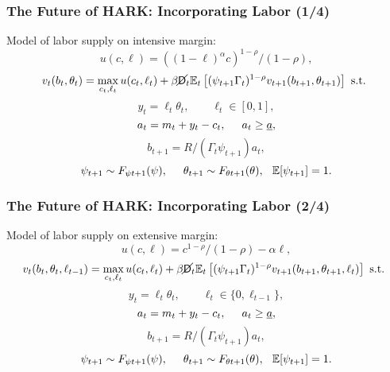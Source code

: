\documentclass[11pt,handout]{beamer}
\newcommand{\E}{\mathbb{E}}
\newcommand{\Die}{\mathsf{D}}
\newcommand{\Live}{\cancel{\Die}}
\begin{document}
\begin{frame}
\frametitle{The Future of HARK: Incorporating Labor (1/4)}
Model of labor supply on intensive margin:
\begin{equation*}
u(c,\ell) = ((1-\ell)^\alpha c)^{1-\rho}/(1-\rho),
\end{equation*}
\begin{equation*}
v_t(b_t,\theta_t) = \max_{c_t, \ell_t} u(c_t,\ell_t) + \beta \Live_t \E_t \left[(\psi_{t+1} \Gamma_t)^{1-\rho} v_{t+1}(b_{t+1},\theta_{t+1}) \right] \text{ s.t. }
\end{equation*}
\begin{equation*}
y_t = \ell_t \theta_t, \qquad \ell_t \in [0,1],
\end{equation*}
\begin{equation*}
a_t = m_t + y_t - c_t, \hspace{0.5cm} a_t \geq \underline{a},
\end{equation*}
\begin{equation*}
b_{t+1} = R/(\Gamma_t \psi_{t+1}) a_t, 
\end{equation*}
\begin{equation*}
\psi_{t+1} \sim F_{\psi t+1}(\psi), \hspace{0.5cm} \theta_{t+1} \sim F_{\theta t+1}(\theta), \hspace{0.25cm} \E[\psi_{t+1}] = 1.
\end{equation*}
\end{frame}


\begin{frame}
\frametitle{The Future of HARK: Incorporating Labor (2/4)}
Model of labor supply on extensive margin:
\begin{equation*}
u(c,\ell) = c^{1-\rho}/(1-\rho) - \alpha \ell,
\end{equation*}
\begin{equation*}
v_t(b_t,\theta_t,\ell_{t-1}) = \max_{c_t, \ell_t} u(c_t,\ell_t) + \beta \Live_t \E_t \left[(\psi_{t+1} \Gamma_t)^{1-\rho} v_{t+1}(b_{t+1},\theta_{t+1},\ell_t) \right] \text{ s.t. }
\end{equation*}
\begin{equation*}
y_t = \ell_t \theta_t, \qquad \ell_t \in \{0,\ell_{t-1}\},
\end{equation*}
\begin{equation*}
a_t = m_t + y_t - c_t, \hspace{0.5cm} a_t \geq \underline{a},
\end{equation*}
\begin{equation*}
b_{t+1} = R/(\Gamma_t \psi_{t+1}) a_t, 
\end{equation*}
\begin{equation*}
\psi_{t+1} \sim F_{\psi t+1}(\psi), \hspace{0.5cm} \theta_{t+1} \sim F_{\theta t+1}(\theta), \hspace{0.25cm} \E[\psi_{t+1}] = 1.
\end{equation*}
\end{frame}
\end{document}
